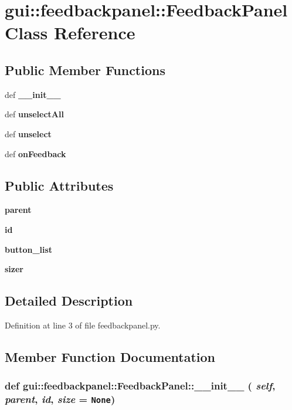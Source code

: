 \section{gui::feedbackpanel::FeedbackPanel Class Reference}
\label{classgui_1_1feedbackpanel_1_1FeedbackPanel}
\subsection*{Public Member Functions}
\begin{CompactItemize}
\item 
def {\bf \_\-\_\-init\_\-\_\-}
\item 
def {\bf unselectAll}
\item 
def {\bf unselect}
\item 
def {\bf onFeedback}
\end{CompactItemize}
\subsection*{Public Attributes}
\begin{CompactItemize}
\item 
{\bf parent}
\item 
{\bf id}
\item 
{\bf button\_\-list}
\item 
{\bf sizer}
\end{CompactItemize}


\subsection{Detailed Description}


Definition at line 3 of file feedbackpanel.py.

\subsection{Member Function Documentation}
\subsubsection{\setlength{\rightskip}{0pt plus 5cm}def gui::feedbackpanel::FeedbackPanel::\_\-\_\-init\_\-\_\- ( {\em self},  {\em parent},  {\em id},  {\em size} = {\tt None})}\label{classgui_1_1feedbackpanel_1_1FeedbackPanel_e2df6e49698d2245c23176d3d5c60e97}





